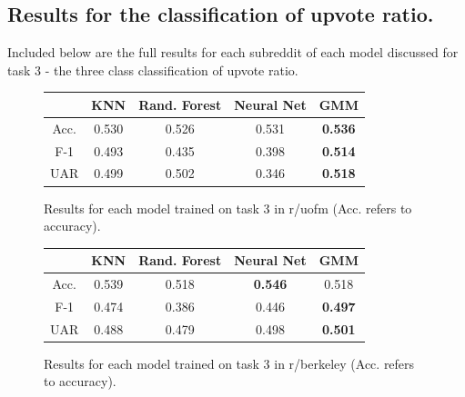 \documentclass[11pt,a4paper]{article}
\let\Oldsubsection\subsection
\renewcommand{\subsection}{\FloatBarrier\Oldsubsection}
\begin{document}
    \subsection{Results for the classification of upvote ratio.}
    \label{sec:appresult}

    Included below are the full results for each subreddit of each model discussed for task 3 - the three class classification of upvote ratio.

    \begin{figure}
        \begin{center}
            \begin{tabular}{ |c|c|c|c|c| }
                \hline
                 & KNN & Rand. Forest & Neural Net & GMM \\
                \hline
                Acc. & 0.530 & 0.526 & 0.531 & \textbf{0.536} \\
                \hline
                F-1 & 0.493 & 0.435 & 0.398 & \textbf{0.514} \\
                \hline
                UAR & 0.499 & 0.502 & 0.346 & \textbf{0.518} \\
                \hline
            \end{tabular}  
        \end{center}

        \caption{Results for each model trained on task 3 in r/uofm (Acc. refers to accuracy).}
    \end{figure}

    \begin{figure}
        \begin{center}
            \begin{tabular}{ |c|c|c|c|c| }
                \hline
                 & KNN & Rand. Forest & Neural Net & GMM \\
                \hline
                Acc. & 0.539 & 0.518 & \textbf{0.546} & 0.518 \\
                \hline
                F-1 & 0.474 & 0.386 & 0.446 & \textbf{0.497} \\
                \hline
                UAR & 0.488 & 0.479 & 0.498 & \textbf{0.501} \\
                \hline
            \end{tabular}  
        \end{center}

        \caption{Results for each model trained on task 3 in r/berkeley (Acc. refers to accuracy).}
    \end{figure}
\end{document}
